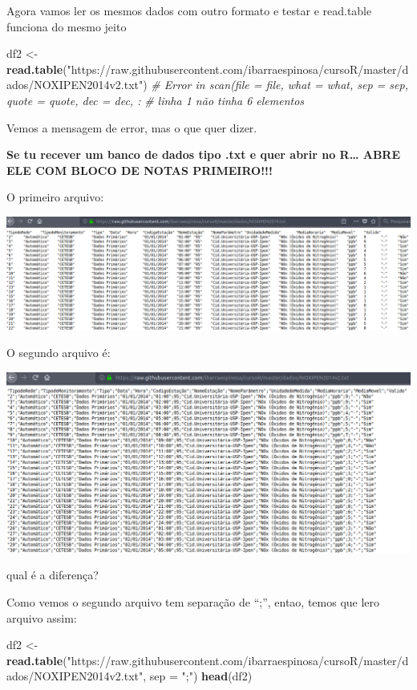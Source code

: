 \documentclass[]{book}
\newenvironment{Shaded}{\begin{snugshade}}{\end{snugshade}}
\newcommand{\KeywordTok}[1]{\textcolor[rgb]{0.13,0.29,0.53}{\textbf{#1}}}
\newcommand{\DataTypeTok}[1]{\textcolor[rgb]{0.13,0.29,0.53}{#1}}
\newcommand{\StringTok}[1]{\textcolor[rgb]{0.31,0.60,0.02}{#1}}
\newcommand{\CommentTok}[1]{\textcolor[rgb]{0.56,0.35,0.01}{\textit{#1}}}
\newcommand{\NormalTok}[1]{#1}
\begin{document}
Agora vamos ler os mesmos dados com outro formato e testar e read.table
funciona do mesmo jeito

\begin{Shaded}
\begin{Highlighting}[]
\NormalTok{df2 <-}\StringTok{ }\KeywordTok{read.table}\NormalTok{(}\StringTok{"https://raw.githubusercontent.com/ibarraespinosa/cursoR/master/dados/NOXIPEN2014v2.txt"}\NormalTok{)}
\CommentTok{# Error in scan(file = file, what = what, sep = sep, quote = quote, dec = dec, : }
\CommentTok{# linha 1 não tinha 6 elementos}
\end{Highlighting}
\end{Shaded}

Vemos a mensagem de error, mas o que quer dizer.

\textbf{Se tu recever um banco de dados tipo .txt e quer abrir no
R\ldots{} ABRE ELE COM BLOCO DE NOTAS PRIMEIRO!!!}

O primeiro arquivo:

\includegraphics[width=18.47in]{figuras/f1}

O segundo arquivo é:

\includegraphics[width=15.33in]{figuras/f2}

qual é a diferença?

Como vemos o segundo arquivo tem separação de ``;'', entao, temos que
lero arquivo assim:

\begin{Shaded}
\begin{Highlighting}[]
\NormalTok{df2 <-}\StringTok{ }\KeywordTok{read.table}\NormalTok{(}\StringTok{"https://raw.githubusercontent.com/ibarraespinosa/cursoR/master/dados/NOXIPEN2014v2.txt"}\NormalTok{, }\DataTypeTok{sep =} \StringTok{";"}\NormalTok{)}
\KeywordTok{head}\NormalTok{(df2)}
\end{Highlighting}
\end{Shaded}
\end{document}
